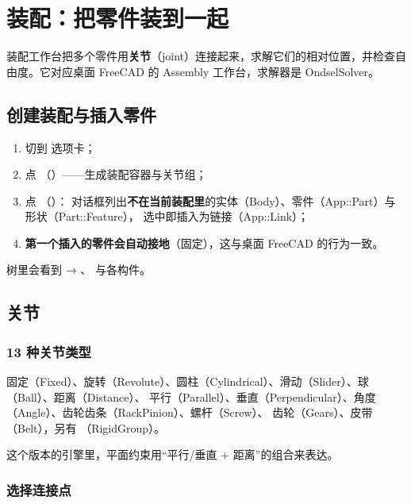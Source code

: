 \chapter{装配：把零件装到一起}

装配工作台把多个零件用\textbf{关节}（joint）连接起来，求解它们的相对位置，并检查自由度。它对应桌面
FreeCAD 的 Assembly 工作台，求解器是 OndselSolver。

\section{创建装配与插入零件}

\begin{enumerate}
  \item 切到  选项卡；
  \item 点 （）——生成装配容器与关节组；
  \item 点 （）：
        对话框列出\textbf{不在当前装配里}的实体（Body）、零件（App::Part）与形状（Part::Feature），
        选中即插入为链接（App::Link）；
  \item \textbf{第一个插入的零件会自动接地}（固定），这与桌面 FreeCAD 的行为一致。
\end{enumerate}

树里会看到  → 、 与各构件。

\section{关节}

\subsection{13 种关节类型}

固定（Fixed）、旋转（Revolute）、圆柱（Cylindrical）、滑动（Slider）、球（Ball）、距离（Distance）、
平行（Parallel）、垂直（Perpendicular）、角度（Angle）、齿轮齿条（RackPinion）、螺杆（Screw）、
齿轮（Gears）、皮带（Belt），另有 （RigidGroup）。

\begin{tip}[没有单独的“平面”关节]
这个版本的引擎里，平面约束用“平行/垂直 + 距离”的组合来表达。
\end{tip}

\subsection{选择连接点}

